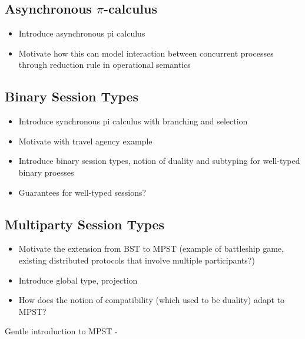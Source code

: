 \subsection{Asynchronous $\pi$-calculus}
\begin{itemize}
\item Introduce asynchronous pi calculus
\item Motivate how this can model interaction between concurrent processes through reduction rule in operational semantics
\end{itemize}

\subsection{Binary Session Types}
\begin{itemize}
\item Introduce synchronous pi calculus with branching and selection
\item Motivate with travel agency example
\item Introduce binary session types, notion of duality and subtyping for well-typed binary proesses
\item Guarantees for well-typed sessions?
\end{itemize}

\subsection{Multiparty Session Types}
\begin{itemize}
\item Motivate the extension from BST to MPST (example of battleship game, existing distributed protocols that involve multiple participants?)
\item Introduce global type, projection
\item How does the notion of compatibility (which used to be duality) adapt to MPST?
\end{itemize}

Gentle introduction to MPST - \cite{MPST}